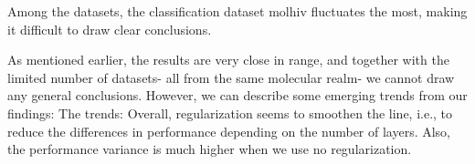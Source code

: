 
Among the datasets, the classification dataset molhiv fluctuates the most, making it difficult to draw clear conclusions.

As mentioned earlier, the results are very close in range, and together with the limited number of datasets- all from the same molecular realm- we cannot draw any general conclusions. However, we can describe some emerging trends from our findings:
The trends:
Overall, regularization seems to smoothen the line, i.e., to reduce the differences in performance depending on the number of layers. Also, the performance variance is much higher when we use no regularization.



